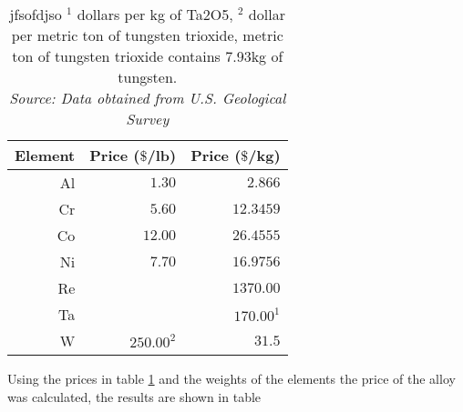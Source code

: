 \begin{table}[h]
    \centering
    \begin{tabular}{rrr}
        \multicolumn{1}{c}{Element} & \multicolumn{1}{c}{Price ($\$$/lb)} & \multicolumn{1}{c}{Price ($\$$/kg)} \\ \hline \hline
        Al & $1.30$ & $2.866$ \\
        Cr & $5.60$ & $12.3459$ \\
        Co & $12.00$ & $26.4555$ \\
        Ni & $7.70$ & $16.9756$ \\
        Re & & $1370.00$ \\
        Ta & &$170.00^1$  \\
        W & $250.00^2$ & $31.5$
    \end{tabular}
    \caption{\centering jfsofdjso $^1$ dollars per kg of Ta2O5, $^2$ dollar per metric ton of tungsten trioxide, metric ton of tungsten trioxide contains 7.93kg of tungsten. \\
    \textit{Source: Data obtained from U.S. Geological Survey \citep{USGS_MCS2025}}}
    \label{tab:tab13}
\end{table}


Using the prices in table \ref{tab:tab13} and the weights of the elements the price of the alloy was calculated, the results are shown in table